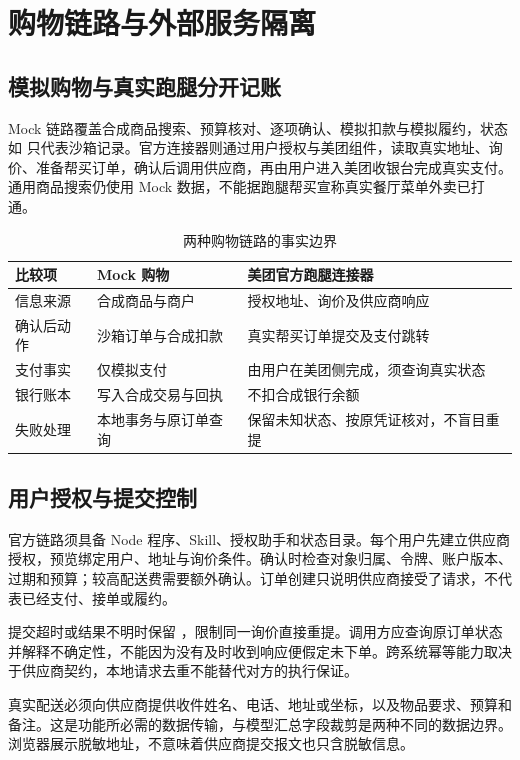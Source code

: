 \sectionstart
\section{购物链路与外部服务隔离}
\subsection{模拟购物与真实跑腿分开记账}
Mock 链路覆盖合成商品搜索、预算核对、逐项确认、模拟扣款与模拟履约，状态如  只代表沙箱记录。官方连接器则通过用户授权与美团组件，读取真实地址、询价、准备帮买订单，确认后调用供应商，再由用户进入美团收银台完成真实支付。通用商品搜索仍使用 Mock 数据，不能据跑腿帮买宣称真实餐厅菜单外卖已打通。

\begin{table}[htbp]\centering\small
\caption{两种购物链路的事实边界}
\begin{tabularx}{\textwidth}{@{}L{2.15cm}YY@{}}\toprule
比较项 & Mock 购物 & 美团官方跑腿连接器 \\\midrule
信息来源 & 合成商品与商户 & 授权地址、询价及供应商响应 \\
确认后动作 & 沙箱订单与合成扣款 & 真实帮买订单提交及支付跳转 \\
支付事实 & 仅模拟支付 & 由用户在美团侧完成，须查询真实状态 \\
银行账本 & 写入合成交易与回执 & 不扣合成银行余额 \\
失败处理 & 本地事务与原订单查询 & 保留未知状态、按原凭证核对，不盲目重提 \\\bottomrule
\end{tabularx}
\end{table}

\subsection{用户授权与提交控制}
官方链路须具备 Node 程序、Skill、授权助手和状态目录。每个用户先建立供应商授权，预览绑定用户、地址与询价条件。确认时检查对象归属、令牌、账户版本、过期和预算；较高配送费需要额外确认。订单创建只说明供应商接受了请求，不代表已经支付、接单或履约。

提交超时或结果不明时保留 ，限制同一询价直接重提。调用方应查询原订单状态并解释不确定性，不能因为没有及时收到响应便假定未下单。跨系统幂等能力取决于供应商契约，本地请求去重不能替代对方的执行保证。

真实配送必须向供应商提供收件姓名、电话、地址或坐标，以及物品要求、预算和备注。这是功能所必需的数据传输，与模型汇总字段裁剪是两种不同的数据边界。浏览器展示脱敏地址，不意味着供应商提交报文也只含脱敏信息。

